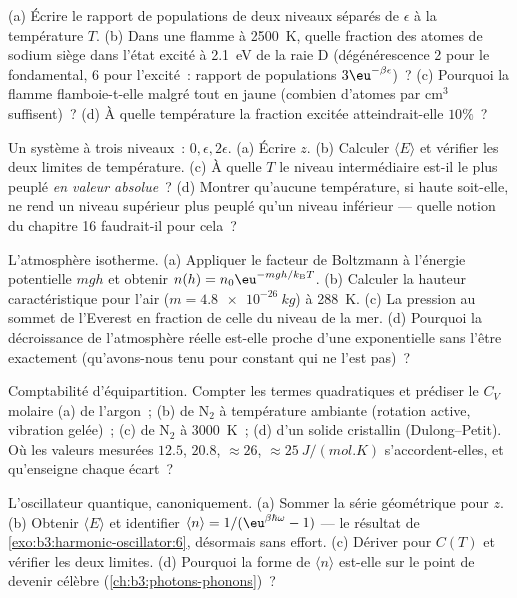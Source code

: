 \begin{exercise}[$\star$]\label{exo:b3:canonical-ensemble:1}
(a) Écrire le rapport de populations de deux niveaux séparés de
$\epsilon$ à la température $T$. (b) Dans une flamme à \qty{2500}{K},
quelle fraction des atomes de sodium siège dans l'état excité à
\qty{2.1}{eV} de la raie D (dégénérescence 2 pour le fondamental, 6
pour l'excité~: rapport de populations $3\eu^{-\beta\epsilon}$)~?
(c) Pourquoi la flamme flamboie-t-elle malgré tout en jaune (combien
d'atomes par cm$^3$ suffisent)~? (d) À quelle température la fraction
excitée atteindrait-elle $10\%$~?
\end{exercise}

\begin{exercise}[$\star$]\label{exo:b3:canonical-ensemble:2}
Un système à trois niveaux~: $0, \epsilon, 2\epsilon$. (a) Écrire
$z$. (b) Calculer $\langle E\rangle$ et vérifier les deux limites de
température. (c) À quelle $T$ le niveau intermédiaire est-il le plus
peuplé \emph{en valeur absolue}~? (d) Montrer qu'aucune température,
si haute soit-elle, ne rend un niveau supérieur plus peuplé qu'un
niveau inférieur --- quelle notion du chapitre 16 faudrait-il pour
cela~?
\end{exercise}

\begin{exercise}[$\star$]\label{exo:b3:canonical-ensemble:3}
L'atmosphère isotherme. (a) Appliquer le facteur de Boltzmann à
l'énergie potentielle $mgh$ et obtenir $n(h) = n_0\eu^{-mgh/k_{\text{B}}
T}$. (b) Calculer la hauteur caractéristique pour l'air
($m = \qty{4.8e-26}{kg}$) à \qty{288}{K}. (c) La pression au sommet de
l'Everest en fraction de celle du niveau de la mer. (d) Pourquoi la
décroissance de l'atmosphère réelle est-elle proche d'une
exponentielle sans l'être exactement (qu'avons-nous tenu pour constant
qui ne l'est pas)~?
\end{exercise}

\begin{exercise}[$\star$]\label{exo:b3:canonical-ensemble:4}
Comptabilité d'équipartition. Compter les termes quadratiques et
prédiser le $C_V$ molaire (a) de l'argon~; (b) de N$_2$ à température
ambiante (rotation active, vibration gelée)~; (c) de N$_2$ à
\qty{3000}{K}~; (d) d'un solide cristallin (Dulong--Petit). Où les
valeurs mesurées $12.5$, $20.8$, $\approx26$,
$\approx\qty{25}{J/(mol.K)}$ s'accordent-elles, et qu'enseigne chaque
écart~?
\end{exercise}

\begin{exercise}[$\star\star$]\label{exo:b3:canonical-ensemble:5}
L'oscillateur quantique, canoniquement. (a) Sommer la série
géométrique pour $z$. (b) Obtenir $\langle E\rangle$ et identifier $\langle
n\rangle = 1/(\eu^{\beta\hbar\omega} - 1)$ --- le résultat de
\cref{exo:b3:harmonic-oscillator:6}, désormais sans effort. (c)
Dériver pour $C(T)$ et vérifier les deux limites. (d) Pourquoi la
forme de $\langle n\rangle$ est-elle sur le point de devenir célèbre
(\cref{ch:b3:photons-phonons})~?
\end{exercise}

